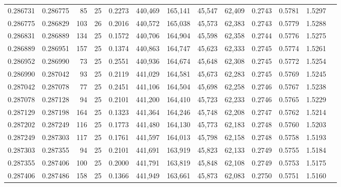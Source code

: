 \begin{tabular}{rrrrrrrrrrrrr}
0.286731 & 0.286775 &    85 &  25 &                                     0.2273 & 440,469 & 165,141 &  45,547 &  62,409 & 0.2743 & 0.5781 & 1.5297 \\
0.286775 & 0.286829 &   103 &  26 &                                     0.2016 & 440,572 & 165,038 &  45,573 &  62,383 & 0.2743 & 0.5779 & 1.5288 \\
0.286831 & 0.286889 &   134 &  25 &                                     0.1572 & 440,706 & 164,904 &  45,598 &  62,358 & 0.2744 & 0.5776 & 1.5275 \\
0.286889 & 0.286951 &   157 &  25 &                                     0.1374 & 440,863 & 164,747 &  45,623 &  62,333 & 0.2745 & 0.5774 & 1.5261 \\
0.286952 & 0.286990 &    73 &  25 &                                     0.2551 & 440,936 & 164,674 &  45,648 &  62,308 & 0.2745 & 0.5772 & 1.5254 \\
0.286990 & 0.287042 &    93 &  25 &                                     0.2119 & 441,029 & 164,581 &  45,673 &  62,283 & 0.2745 & 0.5769 & 1.5245 \\
0.287042 & 0.287078 &    77 &  25 &                                     0.2451 & 441,106 & 164,504 &  45,698 &  62,258 & 0.2746 & 0.5767 & 1.5238 \\
0.287078 & 0.287128 &    94 &  25 &                                     0.2101 & 441,200 & 164,410 &  45,723 &  62,233 & 0.2746 & 0.5765 & 1.5229 \\
0.287129 & 0.287198 &   164 &  25 &                                     0.1323 & 441,364 & 164,246 &  45,748 &  62,208 & 0.2747 & 0.5762 & 1.5214 \\
0.287202 & 0.287249 &   116 &  25 &                                     0.1773 & 441,480 & 164,130 &  45,773 &  62,183 & 0.2748 & 0.5760 & 1.5203 \\
0.287249 & 0.287303 &   117 &  25 &                                     0.1761 & 441,597 & 164,013 &  45,798 &  62,158 & 0.2748 & 0.5758 & 1.5193 \\
0.287303 & 0.287355 &    94 &  25 &                                     0.2101 & 441,691 & 163,919 &  45,823 &  62,133 & 0.2749 & 0.5755 & 1.5184 \\
0.287355 & 0.287406 &   100 &  25 &                                     0.2000 & 441,791 & 163,819 &  45,848 &  62,108 & 0.2749 & 0.5753 & 1.5175 \\
0.287406 & 0.287486 &   158 &  25 &                                     0.1366 & 441,949 & 163,661 &  45,873 &  62,083 & 0.2750 & 0.5751 & 1.5160 \\

\end{tabular}
